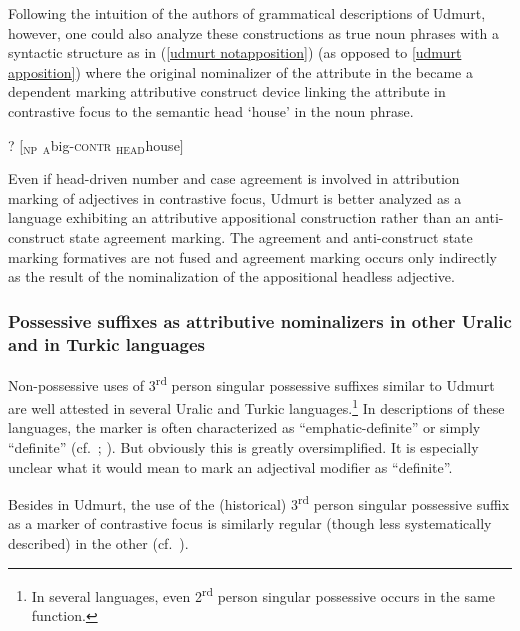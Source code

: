 Following the intuition of the authors of grammatical descriptions of Udmurt, however, one could also analyze these constructions as true noun phrases with a syntactic structure as in (\ref{udmurt notapposition}) (as opposed to \ref{udmurt apposition}) where the original nominalizer of the attribute in the  became a dependent marking attributive construct device linking the attribute in contrastive focus to the semantic head ‘house’ in the noun phrase.
\begin{exe} \label{udmurt notapposition}
\ex ? [$_{\text{NP}}$ $_{\text{A}}$big-\textsc{contr} $_{\text{HEAD}}$house$]$
\end{exe}
Even if head\hyp{}driven number and case agreement is involved in attribution marking of adjectives in contrastive focus, Udmurt is better analyzed as a language exhibiting an attributive appositional construction rather than an anti\hyp{}construct state agreement marking. The agreement and anti\hyp{}construct state marking formatives are not fused and agreement marking occurs only indirectly as the result of the nominalization of the appositional headless adjective.

\subsubsection[Possessive suffixes as attributive nominalizers]{Possessive suffixes as attributive nominalizers in other Uralic and in Turkic languages}
Non-possessive uses of 3\textsuperscript{rd} person singular possessive suffixes similar to Udmurt are well attested in several Uralic and Turkic languages.\footnote{In several languages, even 2\textsuperscript{rd} person singular possessive occurs in the same function.} In descriptions of these languages, the marker is often characterized as “emphatic-definite” or simply “definite” (cf.~\citealt[148]{tauli1966}; \citealt{kunnap2004}). But obviously this is greatly oversimplified. It is especially unclear what it would mean to mark an adjectival modifier as “definite”.

Besides in Udmurt, the use of the (historical) 3\textsuperscript{rd} person singular possessive suffix as a marker of contrastive focus is similarly regular (though less systematically described) in the other  (cf.~\citealt[67]{serebrennikov1963}).%

